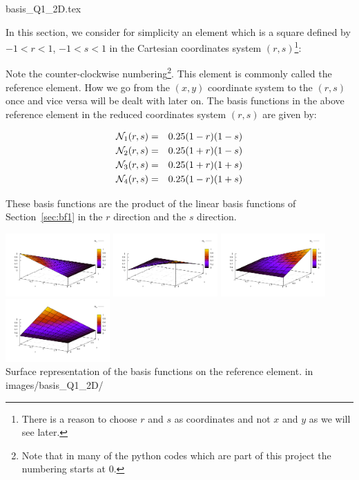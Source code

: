 \begin{flushright} {\tiny {\color{gray} basis\_Q1\_2D.tex}} \end{flushright}

In this section, we consider for simplicity an element which is a square defined 
by $-1<r<1$, $-1<s<1$ in the Cartesian coordinates system $(r,s)$\footnote{There is a 
reason to choose $r$ and $s$ as coordinates and not $x$ and $y$ as we will see later.}:



Note the counter-clockwise numbering\footnote{Note that in many of the python codes which 
are part of this project the numbering starts at 0.}.
This element is commonly called the reference element. How we go from the $(x,y)$ coordinate system 
to the $(r,s)$ once and vice versa will be dealt with later on.
The basis functions in the above reference element in the reduced 
coordinates system $(r,s)$ are given by:
\begin{mdframed}[backgroundcolor=blue!5]
\begin{eqnarray}
{\mathcal{N}}_1(r,s)&=&0.25(1-r)(1-s) \nonumber\\
{\mathcal{N}}_2(r,s)&=&0.25(1+r)(1-s) \nonumber\\
{\mathcal{N}}_3(r,s)&=&0.25(1+r)(1+s) \nonumber\\
{\mathcal{N}}_4(r,s)&=&0.25(1-r)(1+s) 
\end{eqnarray}
\end{mdframed}
These basis functions are the product of the linear basis functions of Section~\ref{sec:bf1}
in the $r$ direction and the $s$ direction.
\begin{center}
\includegraphics[width=4cm]{images/basis_Q1_2D/N1}
\includegraphics[width=4cm]{images/basis_Q1_2D/N2}
\includegraphics[width=4cm]{images/basis_Q1_2D/N3}
\includegraphics[width=4cm]{images/basis_Q1_2D/N4}\\
{\captionfont Surface representation of the basis functions on the reference element.
{\color{gray} in images/basis\_Q1\_2D/ }}
\end{center}
